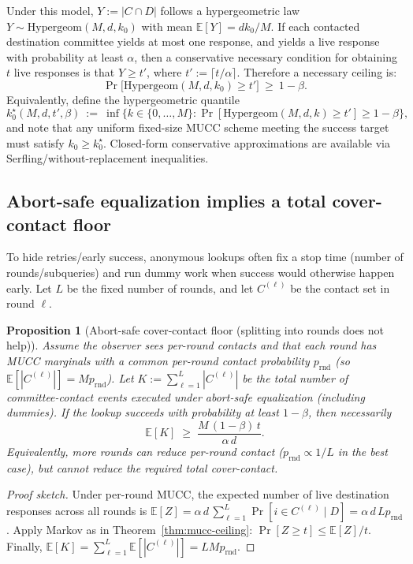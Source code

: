 \documentclass[11pt]{article}
\newtheorem{proposition}{Proposition}
\newcommand{\E}{\mathbb{E}}
\begin{document}
Under this model, $Y:=|C\cap D|$ follows a hypergeometric law $Y\sim \mathrm{Hypergeom}(M,d,k_0)$ with mean $\E[Y]=dk_0/M$.
If each contacted destination committee yields at most one response, and yields a live response with probability at least $\alpha$, then a conservative necessary condition for obtaining $t$ live responses is that $Y\ge t'$, where $t':=\lceil t/\alpha\rceil$.
Therefore a necessary ceiling is:
\[
\Pr\!\bigl[\mathrm{Hypergeom}(M,d,k_0)\ge t'\bigr]\ \ge\ 1-\beta.
\]
Equivalently, define the hypergeometric quantile
\[
k_0^{\star}(M,d,t',\beta)\ :=\ \inf\{k\in\{0,\dots,M\}:\Pr[\mathrm{Hypergeom}(M,d,k)\ge t']\ge 1-\beta\},
\]
and note that any uniform fixed-size MUCC scheme meeting the success target must satisfy $k_0\ge k_0^\star$.
Closed-form conservative approximations are available via Serfling/without-replacement inequalities.\cite{serfling1974sampling,bardenet2015withoutreplacement}

\subsection{Abort-safe equalization implies a total cover-contact floor}
To hide retries/early success, anonymous lookups often fix a stop time (number of rounds/subqueries) and run dummy work when success would otherwise happen early.
Let $L$ be the fixed number of rounds, and let $C^{(\ell)}$ be the contact set in round $\ell$.

\begin{proposition}[Abort-safe cover-contact floor (splitting into rounds does not help)]
\label{prop:mucc-stop-time-floor}
Assume the observer sees per-round contacts and that each round has MUCC marginals with a common per-round contact probability $p_{\mathrm{rnd}}$ (so $\E[|C^{(\ell)}|]=Mp_{\mathrm{rnd}}$).
Let $K:=\sum_{\ell=1}^L |C^{(\ell)}|$ be the total number of committee-contact events executed under abort-safe equalization (including dummies).
If the lookup succeeds with probability at least $1-\beta$, then necessarily
\[
\E[K] \;\ge\; \frac{M\,(1-\beta)\,t}{\alpha\,d}.
\]
Equivalently, more rounds can reduce per-round contact ($p_{\mathrm{rnd}}\propto 1/L$ in the best case), but cannot reduce the required \emph{total} cover-contact.
\end{proposition}

\begin{proof}[Proof sketch]
Under per-round MUCC, the expected number of live destination responses across all rounds is
$\E[Z]=\alpha\,d\,\sum_{\ell=1}^L \Pr[i\in C^{(\ell)}\mid D] = \alpha\,d\,L p_{\mathrm{rnd}}$.
Apply Markov as in Theorem~\ref{thm:mucc-ceiling}: $\Pr[Z\ge t]\le \E[Z]/t$.
Finally, $\E[K]=\sum_{\ell=1}^L \E[|C^{(\ell)}|]=L M p_{\mathrm{rnd}}$.
\end{proof}
\end{document}
